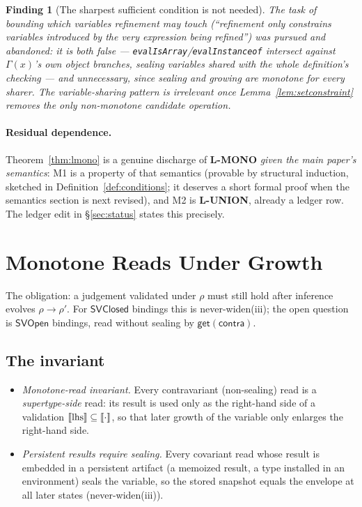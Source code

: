 \documentclass[11pt]{article}
\newtheorem{finding}[theorem]{Finding}
\newcommand{\SVOpen}{\mathsf{SVOpen}}
\newcommand{\SVClosed}{\mathsf{SVClosed}}
\newcommand{\Env}{\Gamma}
\begin{document}
\begin{finding}[The sharpest sufficient condition is not needed]
The task of bounding \emph{which} variables refinement may touch
(``refinement only constrains variables introduced by the very expression
being refined'') was pursued and abandoned: it is both false —
\texttt{evalIsArray}/\texttt{evalInstanceof} intersect against
$\Env(x)$'s own object branches, sealing variables shared with the whole
definition's checking — and unnecessary, since sealing and growing are
monotone for \emph{every} sharer. The variable-sharing pattern is
irrelevant once Lemma~\ref{lem:setconstraint} removes the only
non-monotone candidate operation.
\end{finding}

\paragraph{Residual dependence.} Theorem~\ref{thm:lmono} is a genuine
discharge of \textbf{L-MONO} \emph{given the main paper's semantics}: M1
is a property of that semantics (provable by structural induction,
sketched in Definition~\ref{def:conditions}; it deserves a short formal
proof when the semantics section is next revised), and M2 is
\textbf{L-UNION}, already a ledger row. The ledger edit in
\S\ref{sec:status} states this precisely.

\section{Monotone Reads Under Growth}
\label{sec:monoreads}

The obligation: a judgement validated under $\rho$ must still hold after
inference evolves $\rho \to \rho'$. For $\SVClosed$ bindings this is
never-widen(iii); the open question is $\SVOpen$ bindings, read without
sealing by $\mathsf{get}(\mathsf{contra})$.

\subsection{The invariant}

\begin{definition}
\label{def:read-disciplines}
\begin{itemize}
\item[\textbf{(MR)}] \emph{Monotone-read invariant.} Every
  contravariant (non-sealing) read is a \emph{supertype-side} read: its
  result is used only as the right-hand side of a validation
  $\llbracket \mathrm{lhs} \rrbracket \subseteq \llbracket \cdot \rrbracket$, so that later growth of the
  variable only enlarges the right-hand side.
\item[\textbf{(BR)}] \emph{Persistent results require sealing.} Every covariant read
  whose result is embedded in a persistent artifact (a memoized result, a
  type installed in an environment) seals the variable, so the stored
  snapshot equals the envelope at all later states
  (never-widen(iii)).
\end{itemize}
\end{definition}
\end{document}
